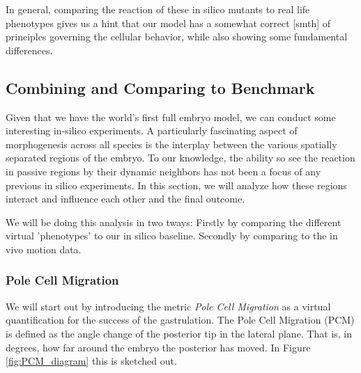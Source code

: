 In general, comparing the reaction of these in silico mutants to real life phenotypes gives us a hint that our model has a somewhat correct [smth] of principles governing the cellular behavior, while also showing some fundamental differences. \reph






\subsection{Combining and Comparing to Benchmark}


Given that we have the world’s first full embryo model, we can conduct some interesting in-silico experiments. A particularly fascinating aspect of morphogenesis across all species is the interplay between the various spatially separated regions of the embryo. To our knowledge, the ability so see the reaction in passive regions by their dynamic neighbors has not been a focus of any previous in silico experiments.  In this section, we will analyze how these regions interact and influence each other and the final outcome.

We will be doing this analysis in two tways: Firstly by comparing the different virtual 'phenotypes' to our in silico baseline. Secondly by comparing to the in vivo motion data.  

\subsubsection{Pole Cell Migration}
We will start out by introducing the metric \textit{Pole Cell Migration} as a virtual quantification for the success of the gastrulation. The Pole Cell Migration (PCM) is defined as the angle change of the posterior tip in the lateral plane. That is, in degrees, how far around the embryo the posterior has moved. In Figure \ref{fig:PCM_diagram} this is sketched out.  \\


